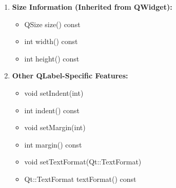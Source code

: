 \documentclass{report}
\begin{document}
\begin{enumerate}[label=\textbf{\arabic*.}]
        \item \textbf{Size Information (Inherited from QWidget):}
        \begin{itemize}
            \item QSize size() const
            \item int width() const
            \item int height() const
        \end{itemize}
        
        \item \textbf{Other QLabel-Specific Features:}
        \begin{itemize}
            \item void setIndent(int)
            \item int indent() const
            \item void setMargin(int)
            \item int margin() const
            \item void setTextFormat(Qt::TextFormat)
            \item Qt::TextFormat textFormat() const
        \end{itemize}
    \end{enumerate}
\end{document}
